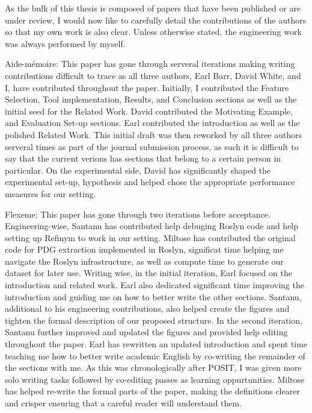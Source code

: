 \begin{acknowledgements}

As the bulk of this thesis is composed of papers that have been published or are
under review, I would now like to carefully detail the contributions of the
authors so that my own work is also clear. Unless otherwise stated, the
engineering work was always performed by myself.

Aide-m\'emoire: This paper has gone through serveral iterations making writing
contributions difficult to trace as all three authors, Earl Barr, David White,
and I, have contributed throughout the paper. Initially, I contributed the
Feature Selection, Tool implementation, Results, and Conclusion sections as well
as the initial seed for the Related Work. David contributed the Motivating
Example, and Evaluation Set-up sections. Earl contributed the introduction as
well as the polished Related Work. This initial draft was then reworked by all
three authors serveral times as part of the journal submission process, as such
it is difficult to say that the current verions has sections that belong to a
certain person in particular. On the experimental side, David has significantly
shaped the experimental set-up, hypothesis and helped chose the appropriate
performance measures for our setting.

Flexeme: This paper has gone through two iterations before acceptance.
Engineering-wise, Santanu has contributed help debuging Roslyn code and help
setting up Refinym to work in our setting. Miltose has contributed the original
code for PDG extraction implemented in Roslyn, significat time helping me
navigate the Roslyn infrastructure, as well as compute time to generate our
dataset for later use. Writing wise, in the initial iteration, Earl focused on
the introduction and related work. Earl also dedicated significant time
improving the introduction and guiding me on how to better write the other
sections. Santanu, additional to his engineering contributions, also helped
create the figures and tighten the formal description of our proposed structure.
In the second iteration, Santanu further improved and updated the figures and
provided help editing throughout the paper. Earl has rewritten an updated
introduction and spent time teaching me how to better write academic English by
co-writing the remainder of the sections with me. As this was chronologically
after POSIT, I was given more solo writing tasks followed by co-editing passes
as learning oppurtunities. Miltose has helped re-write the formal parts of the
paper, making the definitions clearer and crisper ensuring that a careful reader
will understand them.


\end{acknowledgements}
